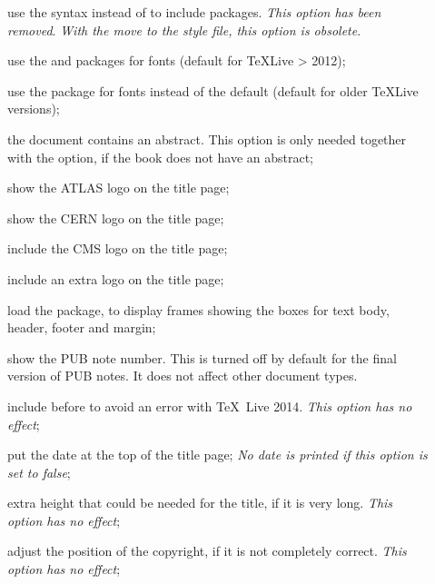 \begin{description}
\item[] use the syntax 
  instead of  to include packages.
  \emph{ This option has been removed}.
  \emph{ With the move to the  style file, this option is obsolete}.
\item[] use the  and  packages for fonts 
  (default for \TeX Live > 2012);
\item[] use the  package for fonts instead of the default
  (default for older \TeX Live versions);
\item[] the document contains an abstract.
  This option is only needed together with the  option,
  if the book does not have an abstract;
\item[] show the ATLAS logo on the title page;
\item[] show the CERN logo on the title page;
\item[] include the CMS logo on the title page;
\item[] include an extra logo on the title page;
\item[] load the  package, to display frames showing the boxes for text body, header, footer and margin;
\item[] show the PUB note number.
  This is turned off by default for the final version of PUB notes.
  It does not affect other document types.
\item[] include  before  to avoid
  an error with \TeX\ Live 2014.
  \emph{ This option has no effect};
\item[] put the date at the top of the title page;
  \emph{ No date is printed if this option is set to false};
\item[] extra height that could be needed for the title, if it is very long.
  \emph{ This option has no effect};
\item[] adjust the position of the copyright, if it is not completely correct.
  \emph{ This option has no effect};
\end{description}

